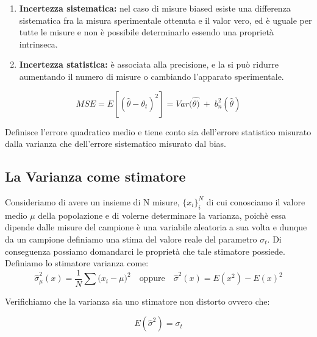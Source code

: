 \begin{enumerate}
	\item \textbf{Incertezza sistematica:} nel caso di misure biased esiste una differenza sistematica fra la misura sperimentale ottenuta e il valor vero, ed \`{e} uguale per tutte le misure e non \`{e} possibile determinarlo essendo una propriet\`{a} intrinseca.
	\item \textbf{Incertezza statistica:} \`{e} associata alla precisione, e la si pu\`{o} ridurre aumentando il numero di misure o cambiando l'apparato sperimentale.
\end{enumerate}
\begin{equation}
		MSE =E[(\hat{\theta} -\theta_t)^2] =Var(\hat{\theta)} \: + \; b_{n}^2(\hat{\theta}) 
\end{equation}

Definisce l'errore quadratico medio e tiene conto sia dell'errore statistico misurato dalla varianza che dell'errore sistematico misurato dal bias.
\subsection{La Varianza come stimatore}

Consideriamo di avere un insieme di N misure, $\{x_{i}\}_{i}^N$ di cui conosciamo il valore medio $\mu$ della popolazione e di volerne determinare la varianza, poich\`{e} essa dipende dalle misure del campione \`{e} una variabile aleatoria a sua volta e dunque da un campione definiamo una stima del valore reale del parametro $\sigma_{t}$. Di conseguenza possiamo domandarci le propriet\`{a} che tale stimatore possiede.
	\newline
Definiamo lo stimatore varianza come:		
\begin{equation*}
		 \hat{\sigma}_{\mu}^2(x) = \frac{1}{N} \sum{(x_{i}-\mu})^2 \quad \text{oppure} \quad   \hat{\sigma}^2(x) = E(x^2) - E(x)^2
\end{equation*}

\noindent Verifichiamo che la varianza sia uno stimatore non distorto ovvero che:

\begin{equation*}
		E(\hat{\sigma}^2) = \sigma_{t}	
\end{equation*}

